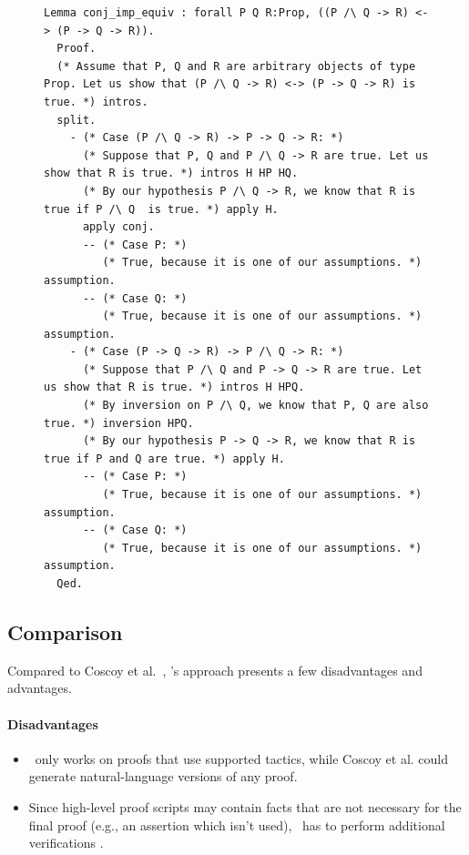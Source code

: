 \documentclass[sigplan,screen,9pt]{acmart}
\begin{document}
\begin{figure}
\begin{lstlisting}[label=listing:output, captionpos=b, caption={Output in annotation mode}]
  Lemma conj_imp_equiv : forall P Q R:Prop, ((P /\ Q -> R) <-> (P -> Q -> R)).
  Proof.
  (* Assume that P, Q and R are arbitrary objects of type Prop. Let us show that (P /\ Q -> R) <-> (P -> Q -> R) is true. *) intros.
  split.
    - (* Case (P /\ Q -> R) -> P -> Q -> R: *) 
      (* Suppose that P, Q and P /\ Q -> R are true. Let us show that R is true. *) intros H HP HQ.
      (* By our hypothesis P /\ Q -> R, we know that R is true if P /\ Q  is true. *) apply H.
      apply conj.
      -- (* Case P: *)
         (* True, because it is one of our assumptions. *) assumption.
      -- (* Case Q: *)
         (* True, because it is one of our assumptions. *) assumption.
    - (* Case (P -> Q -> R) -> P /\ Q -> R: *)
      (* Suppose that P /\ Q and P -> Q -> R are true. Let us show that R is true. *) intros H HPQ.
      (* By inversion on P /\ Q, we know that P, Q are also true. *) inversion HPQ.
      (* By our hypothesis P -> Q -> R, we know that R is true if P and Q are true. *) apply H.
      -- (* Case P: *)
         (* True, because it is one of our assumptions. *) assumption.
      -- (* Case Q: *)
         (* True, because it is one of our assumptions. *) assumption.
  Qed.
\end{lstlisting}
\end{figure}


\subsection{Comparison}
Compared to Coscoy et al.~\cite{DBLP:conf/tlca/CoscoyKT95,DBLP:conf/lacl/Coscoy96}, \coqatoo's approach presents a few disadvantages and advantages.
\paragraph{Disadvantages}
\begin{itemize}
  \item{\coqatoo\ only works on proofs that use supported tactics, while Coscoy et al. could generate natural-language versions of any proof.}
  \item{Since high-level proof scripts may contain facts that are not necessary for the final proof (e.g., an assertion which isn't used), \coqatoo\ has to perform additional verifications .}
\end{itemize}
\end{document}
